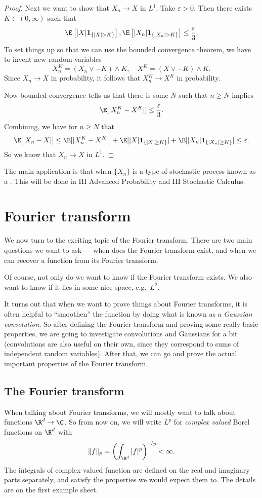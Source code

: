 \documentclass[a4paper]{article}
\begin{document}
\begin{proof}
  Next we want to show that $X_n \to X$ in $L^1$. Take $\varepsilon > 0$. Then there exists $K \in (0, \infty)$ such that
  \[
    \E\left[|X| \mathbf{1}_{\{|X| > K\}}\right], \E\left[|X_n| \mathbf{1}_{\{|X_n| > K\}}\right] \leq \frac{\varepsilon}{3}.
  \]
  To set things up so that we can use the bounded convergence theorem, we have to invent new random variables
  \[
    X_n^K = (X_n \vee -K) \wedge K,\quad X^K = (X \vee -K)\wedge K.
  \]
  Since $X_n \to X$ in probability, it follows that $X_n^K \to X^K$ in probability.

  Now bounded convergence tells us that there is some $N$ such that $n \geq N$ implies
  \[
    \E[|X_n^K - X^K|] \leq \frac{\varepsilon}{3}.
  \]
  Combining, we have for $n \geq N$ that
  \[
    \E[|X_n - X|] \leq \E[|X_n^K - X^K|] + \E[|X|\mathbf{1}_{\{|X| \geq K\}}] + \E[|X_n|\mathbf{1}_{\{|X_n| \geq K\}}] \leq \varepsilon.
  \]
  So we know that $X_n \to X$ in $L^1$.
\end{proof}

The main application is that when $\{X_n\}$ is a type of stochastic process known as a . This will be done in III Advanced Probability and III Stochastic Calculus.

\section{Fourier transform}
We now turn to the exciting topic of the Fourier transform. There are two main questions we want to ask --- when does the Fourier transform exist, and when we can recover a function from its Fourier transform.

Of course, not only do we want to know if the Fourier transform exists. We also want to know if it lies in some nice space, e.g.\ $L^2$.

It turns out that when we want to prove things about Fourier transforms, it is often helpful to ``smoothen'' the function by doing what is known as a \emph{Gaussian convolution}. So after defining the Fourier transform and proving some really basic properties, we are going to investigate convolutions and Gaussians for a bit (convolutions are also useful on their own, since they correspond to sums of independent random variables). After that, we can go and prove the actual important properties of the Fourier transform.

\subsection{The Fourier transform}
When talking about Fourier transforms, we will mostly want to talk about functions $\R^d \to \C$. So from now on, we will write $L^p$ for \emph{complex valued} Borel functions on $\R^d$ with
\[
  \|f\|_p = \left(\int_{\R^d} |f|^p\right)^{1/p} < \infty.
\]
The integrals of complex-valued function are defined on the real and imaginary parts separately, and satisfy the properties we would expect them to. The details are on the first example sheet.
\end{document}
